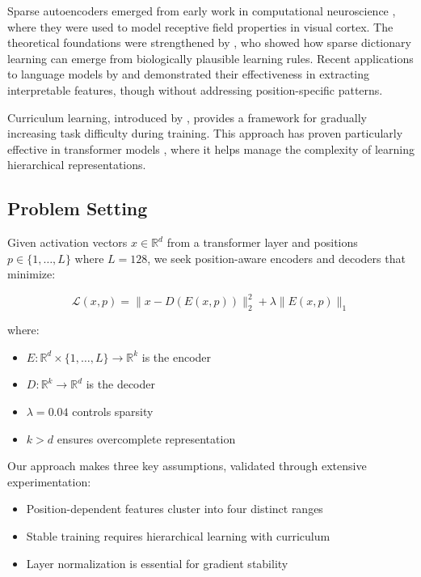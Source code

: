 \documentclass{article} %
\begin{document}
Sparse autoencoders emerged from early work in computational neuroscience \cite{Olshausen1996EmergenceOS}, where they were used to model receptive field properties in visual cortex. The theoretical foundations were strengthened by \cite{Hu2014AHN}, who showed how sparse dictionary learning can emerge from biologically plausible learning rules. Recent applications to language models by \cite{Cunningham2023SparseAF} and \cite{Marks2024SparseFC} demonstrated their effectiveness in extracting interpretable features, though without addressing position-specific patterns.

Curriculum learning, introduced by \cite{Bengio2009CurriculumL}, provides a framework for gradually increasing task difficulty during training. This approach has proven particularly effective in transformer models \cite{Weinshall2018CurriculumLB}, where it helps manage the complexity of learning hierarchical representations.

\subsection{Problem Setting}
Given activation vectors $x \in \mathbb{R}^d$ from a transformer layer and positions $p \in \{1,\ldots,L\}$ where $L=128$, we seek position-aware encoders and decoders that minimize:

\begin{equation}
    \mathcal{L}(x,p) = \|x - D(E(x,p))\|_2^2 + \lambda\|E(x,p)\|_1
\end{equation}

where:
\begin{itemize}
    \item $E: \mathbb{R}^d \times \{1,\ldots,L\} \rightarrow \mathbb{R}^k$ is the encoder
    \item $D: \mathbb{R}^k \rightarrow \mathbb{R}^d$ is the decoder
    \item $\lambda=0.04$ controls sparsity
    \item $k > d$ ensures overcomplete representation
\end{itemize}

Our approach makes three key assumptions, validated through extensive experimentation:
\begin{itemize}
    \item Position-dependent features cluster into four distinct ranges
    \item Stable training requires hierarchical learning with curriculum
    \item Layer normalization is essential for gradient stability
\end{itemize}
\end{document}
